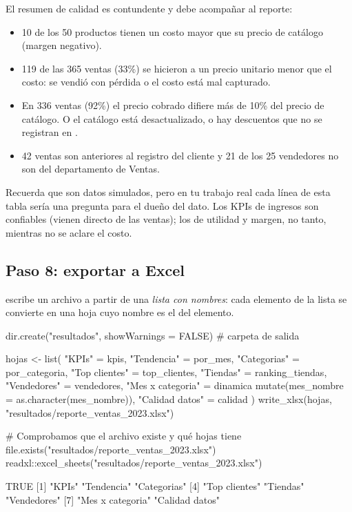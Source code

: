 El resumen de calidad es contundente y debe acompañar al reporte:
\begin{itemize}
  \item 10 de los 50 productos tienen un costo mayor que su precio de
        catálogo (margen negativo).
  \item 119 de las 365 ventas (33\%) se hicieron a un precio unitario
        menor que el costo: se vendió con pérdida o el costo está mal
        capturado.
  \item En 336 ventas (92\%) el precio cobrado difiere más de 10\% del precio
        de catálogo. O el catálogo está desactualizado, o hay descuentos
        que no se registran en .
  \item 42 ventas son anteriores al registro del cliente y 21 de los 25
        vendedores no son del departamento de Ventas.
\end{itemize}
Recuerda que son datos simulados, pero en tu trabajo real cada línea de esta
tabla sería una pregunta para el dueño del dato. Los KPIs de ingresos son
confiables (vienen directo de las ventas); los de utilidad y margen, no
tanto, mientras no se aclare el costo.

\subsection{Paso 8: exportar a Excel}

 escribe un archivo  a partir de una
\emph{lista con nombres}: cada elemento de la lista se convierte en una hoja
cuyo nombre es el del elemento.

\begin{rcode}[title=Reporte mensual: exportar]
dir.create("resultados", showWarnings = FALSE)   # carpeta de salida

hojas <- list(
  "KPIs"           = kpis,
  "Tendencia"      = por_mes,
  "Categorias"     = por_categoria,
  "Top clientes"   = top_clientes,
  "Tiendas"        = ranking_tiendas,
  "Vendedores"     = vendedores,
  "Mes x categoria" = dinamica %
                       mutate(mes_nombre = as.character(mes_nombre)),
  "Calidad datos"  = calidad
)
write_xlsx(hojas, "resultados/reporte_ventas_2023.xlsx")

# Comprobamos que el archivo existe y qué hojas tiene
file.exists("resultados/reporte_ventas_2023.xlsx")
readxl::excel_sheets("resultados/reporte_ventas_2023.xlsx")
\end{rcode}
\begin{rsalida}
[1] TRUE
[1] "KPIs"            "Tendencia"       "Categorias"     
[4] "Top clientes"    "Tiendas"         "Vendedores"     
[7] "Mes x categoria" "Calidad datos"  
\end{rsalida}

